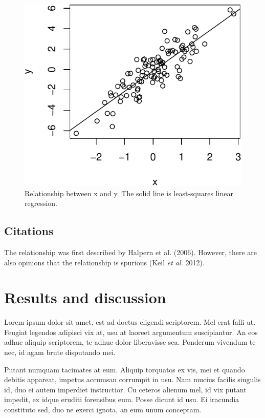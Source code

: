 \documentclass[]{article}
\begin{document}
\begin{figure}[htbp]
\centering
\includegraphics{manuscript_template_files/figure-latex/carDataPlot-1.pdf}
\caption{Relationship between x and y. The solid line is least-squares
linear regression.}
\end{figure}

\subsection{Citations}\label{citations}

The relationship was first described by Halpern et al. (2006). However,
there are also opinions that the relationship is spurious (Keil \emph{et
al.} 2012).

\section{Results and discussion}\label{results-and-discussion}

Lorem ipsum dolor sit amet, est ad doctus eligendi scriptorem. Mel erat
falli ut. Feugiat legendos adipisci vix at, usu at laoreet argumentum
suscipiantur. An eos adhuc aliquip scriptorem, te adhuc dolor
liberavisse sea. Ponderum vivendum te nec, id agam brute disputando mei.

Putant numquam tacimates at eum. Aliquip torquatos ex vis, mei et quando
debitis appareat, impetus accumsan corrumpit in usu. Nam mucius facilis
singulis id, duo ei autem imperdiet instructior. Cu ceteros alienum mel,
id vix putant impedit, ex idque eruditi forensibus eum. Posse dicunt id
usu. Ei iracundia constituto sed, duo ne exerci ignota, an eum unum
conceptam.
\end{document}
